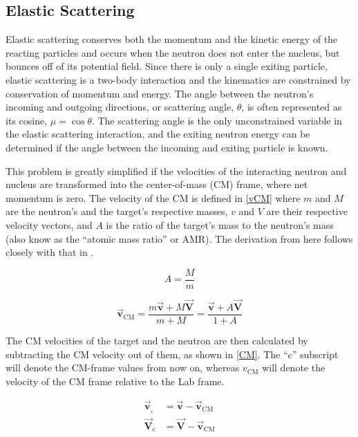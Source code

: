 \subsection{Elastic Scattering}

Elastic scattering conserves both the momentum and the kinetic energy of the reacting particles and occurs when the neutron does not enter the nucleus, but bounces off of its potential field.  Since there is only a single exiting particle, elastic scattering is a two-body interaction and the kinematics are constrained by conservation of momentum and energy.  The angle between the neutron's incoming and outgoing directions, or scattering angle, $\theta$, is often represented as its cosine, $\mu = \cos \theta$.  The scattering angle is the only unconstrained variable in the elastic scattering interaction, and the exiting neutron energy can be determined if the angle between the incoming and exiting particle is known.  

This problem is greatly simplified if the velocities of the interacting neutron and nucleus are transformed into the center-of-mass (CM) frame, where net momentum is zero. The velocity of the CM is defined in \eqref{vCM} where $m$ and $M$ are the neutron's and the target's respective masses, $v$ and $V$ are their respective velocity vectors, and $A$ is the ratio of the target's mass to the neutron's mass (also know as the ``atomic mass ratio'' or AMR).  The derivation from here follows closely with that in \cite{jaakko}.

\begin{equation}
A = \frac{M}{m}
\label{AWR}
\end{equation}

\begin{equation}
\boldsymbol{\vec{v}_{\mathrm{CM}}} = \frac{ m \boldsymbol{\vec{v}} + M \boldsymbol{\vec{V}} }    {m+M} = \frac{ \boldsymbol{\vec{v}} + A \boldsymbol{\vec{V}} }    {1+A}
\label{vCM}
\end{equation}

The CM velocities of the target and the neutron are then calculated by subtracting the CM velocity out of them, as shown in \eqref{CM}.  The ``$c$'' subscript will denote the CM-frame values from now on, whereas $v_{\mathrm{CM}}$ will denote the velocity of the CM frame relative to the Lab frame.

\begin{equation}
\begin{split}
 \boldsymbol{\vec{v}_{_\mathrm{c}}} &= \boldsymbol{\vec{v}} - \boldsymbol{\vec{v}_{\mathrm{CM}}} \\  
 \boldsymbol{\vec{V}_{\mathrm{c}}} &= \boldsymbol{\vec{V}} - \boldsymbol{\vec{v}_{\mathrm{CM}}}
 \end{split}
\label{CM}
\end{equation}

